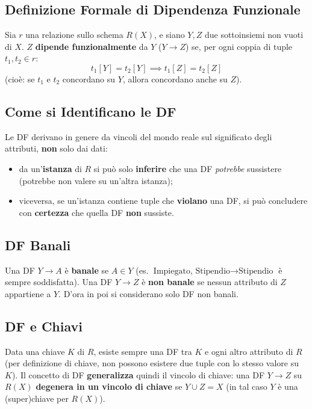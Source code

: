 \documentclass[12pt, a4paper]{article}
\begin{document}
\subsection{Definizione Formale di Dipendenza Funzionale}

Sia $r$ una relazione sullo schema $R(X)$, e siano $Y,Z$ due sottoinsiemi non vuoti di $X$. $Z$ \textbf{dipende funzionalmente} da $Y$ ($Y \rightarrow Z$) se, per ogni coppia di tuple $t_1,t_2 \in r$:
$$t_1[Y] = t_2[Y] \implies t_1[Z] = t_2[Z]$$
(cioè: se $t_1$ e $t_2$ concordano su $Y$, allora concordano anche su $Z$).

\subsection{Come si Identificano le DF}

Le DF derivano in genere da vincoli del mondo reale sul significato degli attributi, \textbf{non} solo dai dati:
\begin{itemize}
    \item da un'\textbf{istanza} di $R$ si può solo \textbf{inferire} che una DF \textit{potrebbe} sussistere (potrebbe non valere su un'altra istanza);
    \item viceversa, se un'istanza contiene tuple che \textbf{violano} una DF, si può concludere con \textbf{certezza} che quella DF \textbf{non} sussiste.
\end{itemize}

\subsection{DF Banali}

Una DF $Y \rightarrow A$ è \textbf{banale} se $A \in Y$ (es. $\text{Impiegato, Stipendio} \rightarrow \text{Stipendio}$ è sempre soddisfatta). Una DF $Y \rightarrow Z$ è \textbf{non banale} se nessun attributo di $Z$ appartiene a $Y$. D'ora in poi si considerano solo DF non banali.

\subsection{DF e Chiavi}

Data una chiave $K$ di $R$, esiste sempre una DF tra $K$ e ogni altro attributo di $R$ (per definizione di chiave, non possono esistere due tuple con lo stesso valore su $K$). Il concetto di DF \textbf{generalizza} quindi il vincolo di chiave: una DF $Y \rightarrow Z$ su $R(X)$ \textbf{degenera in un vincolo di chiave} se $Y \cup Z = X$ (in tal caso $Y$ è una (super)chiave per $R(X)$).
\end{document}
